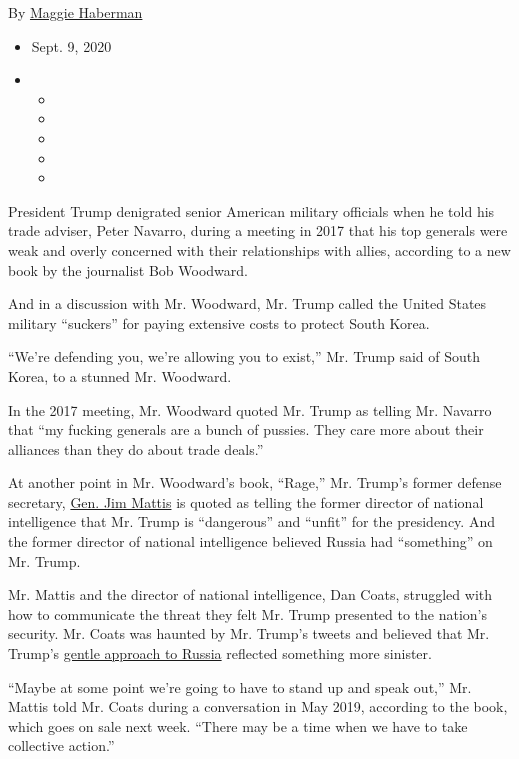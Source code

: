 By \href{https://www.nytimes3xbfgragh.onion/by/maggie-haberman}{Maggie
Haberman}

\begin{itemize}
\item
  Sept. 9, 2020
\item
  \begin{itemize}
  \item
  \item
  \item
  \item
  \item
  \end{itemize}
\end{itemize}

President Trump denigrated senior American military officials when he
told his trade adviser, Peter Navarro, during a meeting in 2017 that his
top generals were weak and overly concerned with their relationships
with allies, according to a new book by the journalist Bob Woodward.

And in a discussion with Mr. Woodward, Mr. Trump called the United
States military ``suckers'' for paying extensive costs to protect South
Korea.

``We're defending you, we're allowing you to exist,'' Mr. Trump said of
South Korea, to a stunned Mr. Woodward.

In the 2017 meeting, Mr. Woodward quoted Mr. Trump as telling Mr.
Navarro that ``my fucking generals are a bunch of pussies. They care
more about their alliances than they do about trade deals.''

At another point in Mr. Woodward's book, ``Rage,'' Mr. Trump's former
defense secretary,
\href{https://www.nytimes3xbfgragh.onion/2018/12/21/us/politics/trump-mattis-american-first-foreign-policy.html}{Gen.
Jim Mattis} is quoted as telling the former director of national
intelligence that Mr. Trump is ``dangerous'' and ``unfit'' for the
presidency. And the former director of national intelligence believed
Russia had ``something'' on Mr. Trump.

Mr. Mattis and the director of national intelligence, Dan Coats,
struggled with how to communicate the threat they felt Mr. Trump
presented to the nation's security. Mr. Coats was haunted by Mr. Trump's
tweets and believed that Mr. Trump's
\href{https://www.nytimes3xbfgragh.onion/2020/07/31/us/politics/trump-russia-nato-bounties.html}{gentle
approach to Russia} reflected something more sinister.

``Maybe at some point we're going to have to stand up and speak out,''
Mr. Mattis told Mr. Coats during a conversation in May 2019, according
to the book, which goes on sale next week. ``There may be a time when we
have to take collective action.''

